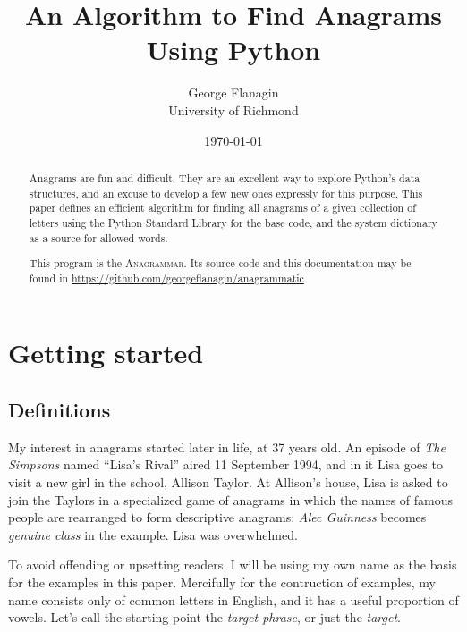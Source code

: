\documentclass[letterpaper, 11pt]{article}
\title{An Algorithm to Find Anagrams Using Python}
\author{George Flanagin\\University of Richmond\\\lit{gflanagin@richmond.edu}}
\date{\today}
\providecommand{\anagrammar}{A\textsc{nagrammar}\xspace}
\begin{document}
\maketitle
\begin{abstract}
Anagrams are fun and difficult. They are an excellent way to explore
Python's data structures, and an excuse to develop a few new ones
expressly for this purpose. This paper defines an efficient algorithm
for finding all anagrams of a given collection of letters using the
Python Standard Library for the base code, and the system dictionary
as a source for allowed words. 

This program is the \anagrammar. Its source code and this documentation
may be found in \href{https://github.com/georgeflanagin/anagrammatic}
{https://github.com/georgeflanagin/anagrammatic}

\end{abstract}

\tableofcontents
\listoffigures

\newpage
\pagewiselinenumbers
\section{Getting started}

\subsection{Definitions}
My interest in anagrams started later in life, at 37 years old. An episode of
\emph{The Simpsons} named ``Lisa's Rival'' aired 11 September 1994,
and in it Lisa goes to visit a new girl in the school, Allison
Taylor. At Allison's house, Lisa is asked to join the Taylors in a
specialized game of anagrams in which the names of famous people
are rearranged to form descriptive anagrams: \emph{Alec Guinness}
becomes \emph{genuine class} in the example. Lisa was overwhelmed.

To avoid offending or upsetting readers, I will be using my own
name as the basis for the examples in this paper. Mercifully for
the contruction of examples, my name consists only of common letters
in English, and it has a useful proportion of vowels. Let's call
the starting point the \emph{target phrase}, or just the \emph{target}.
\end{document}
